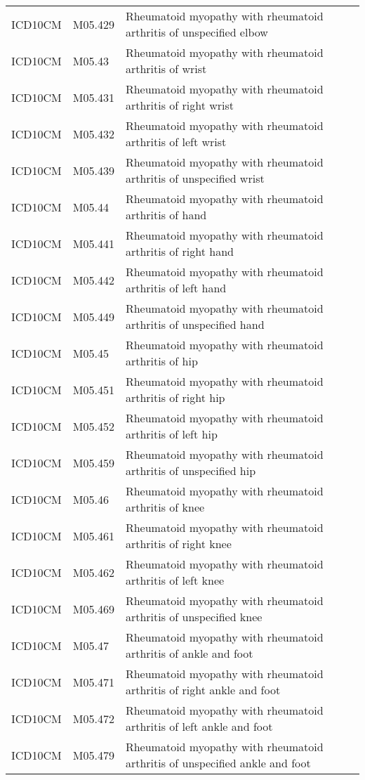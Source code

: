 \begin{longtable}{p{}p{}p{}}
  ICD10CM & M05.429 & Rheumatoid myopathy with rheumatoid arthritis of unspecified elbow \\ 
  ICD10CM & M05.43 & Rheumatoid myopathy with rheumatoid arthritis of wrist \\ 
  ICD10CM & M05.431 & Rheumatoid myopathy with rheumatoid arthritis of right wrist \\ 
  ICD10CM & M05.432 & Rheumatoid myopathy with rheumatoid arthritis of left wrist \\ 
  ICD10CM & M05.439 & Rheumatoid myopathy with rheumatoid arthritis of unspecified wrist \\ 
  ICD10CM & M05.44 & Rheumatoid myopathy with rheumatoid arthritis of hand \\ 
  ICD10CM & M05.441 & Rheumatoid myopathy with rheumatoid arthritis of right hand \\ 
  ICD10CM & M05.442 & Rheumatoid myopathy with rheumatoid arthritis of left hand \\ 
  ICD10CM & M05.449 & Rheumatoid myopathy with rheumatoid arthritis of unspecified hand \\ 
  ICD10CM & M05.45 & Rheumatoid myopathy with rheumatoid arthritis of hip \\ 
  ICD10CM & M05.451 & Rheumatoid myopathy with rheumatoid arthritis of right hip \\ 
  ICD10CM & M05.452 & Rheumatoid myopathy with rheumatoid arthritis of left hip \\ 
  ICD10CM & M05.459 & Rheumatoid myopathy with rheumatoid arthritis of unspecified hip \\ 
  ICD10CM & M05.46 & Rheumatoid myopathy with rheumatoid arthritis of knee \\ 
  ICD10CM & M05.461 & Rheumatoid myopathy with rheumatoid arthritis of right knee \\ 
  ICD10CM & M05.462 & Rheumatoid myopathy with rheumatoid arthritis of left knee \\ 
  ICD10CM & M05.469 & Rheumatoid myopathy with rheumatoid arthritis of unspecified knee \\ 
  ICD10CM & M05.47 & Rheumatoid myopathy with rheumatoid arthritis of ankle and foot \\ 
  ICD10CM & M05.471 & Rheumatoid myopathy with rheumatoid arthritis of right ankle and foot \\ 
  ICD10CM & M05.472 & Rheumatoid myopathy with rheumatoid arthritis of left ankle and foot \\ 
  ICD10CM & M05.479 & Rheumatoid myopathy with rheumatoid arthritis of unspecified ankle and foot \\ 

\end{longtable}

